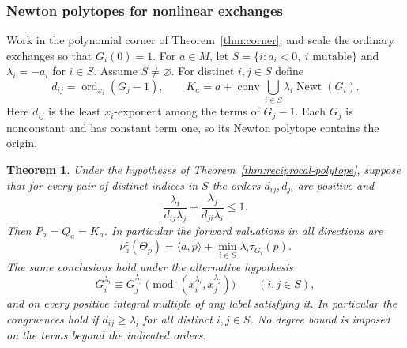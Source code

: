 \documentclass[11pt,reqno]{amsart}
\numberwithin{equation}{section}
\newtheorem{theorem}{Theorem}[section]
\theoremstyle{definition}
\theoremstyle{remark}
\DeclareMathOperator{\Newt}{Newt}
\begin{document}
\subsubsection{Newton polytopes for nonlinear exchanges}

Work in the polynomial corner of Theorem~\ref{thm:corner}, and scale
the ordinary exchanges so that \(G_i(0)=1\). For \(a\in M\),
let \(S=\{i:a_i<0,\ i\text{ mutable}\}\) and
\(\lambda_i=-a_i\) for \(i\in S\). Assume \(S\ne\varnothing\).
For distinct \(i,j\in S\) define
\[ d_{ij}=\operatorname{ord}_{x_i}(G_j-1),\qquad K_a=a+\operatorname{conv}\!\bigcup_{i\in S} \lambda_i\Newt(G_i). \]
Here \(d_{ij}\) is the least \(x_i\)-exponent among the terms of
\(G_j-1\). Each \(G_j\) is nonconstant and has constant term one,
so its Newton polytope contains the origin.

\begin{theorem}\label{thm:nonlinear-simplex-reciprocity}
Under the hypotheses of Theorem~\ref{thm:reciprocal-polytope},
suppose that for every pair of distinct indices in \(S\) the orders
\(d_{ij},d_{ji}\) are positive and
\begin{equation}\label{eq:pair-pole-bound}
\frac{\lambda_i}{d_{ij}\lambda_j} +\frac{\lambda_j}{d_{ji}\lambda_i}\le 1.
\end{equation}
Then \(P_a=Q_a=K_a\). In particular the forward valuations in all
directions are
\begin{equation}\label{eq:nonlinear-theta-valuation}
\nu^z_a(\Theta_p)=\langle a,p\rangle+ \min_{i\in S}\lambda_i\tau_{G_i}(p).
\end{equation}
The same conclusions hold under the alternative hypothesis
\begin{equation}\label{eq:pair-pole-congruence}
G_i^{\lambda_i}\equiv G_j^{\lambda_j} \pmod{(x_i^{\lambda_i},x_j^{\lambda_j})} \qquad(i,j\in S),
\end{equation}
and on every positive integral multiple of any label satisfying it.
In particular the congruences hold if \(d_{ij}\ge\lambda_i\) for
all distinct \(i,j\in S\).
No degree bound is imposed on the terms beyond the indicated orders.
\end{theorem}
\end{document}
